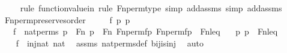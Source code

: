 \begin{isabellebody}
\ \ \ \ \isamarkupfalse%
{\isacharparenleft}{\kern0pt}rule\ function{\isacharunderscore}{\kern0pt}value{\isacharunderscore}{\kern0pt}in{\isacharcomma}{\kern0pt}\ rule\ Fn{\isacharunderscore}{\kern0pt}perm{\isacharprime}{\kern0pt}{\isacharunderscore}{\kern0pt}type{\isacharcomma}{\kern0pt}\ simp\ add{\isacharcolon}{\kern0pt}assms{\isacharcomma}{\kern0pt}\ simp\ add{\isacharcolon}{\kern0pt}assms{\isacharparenright}{\kern0pt}\isanewline
\ \ \ \ \isamarkupfalse%
\isanewline
{}\isamarkupfalse%
%
\endisatagproof
{\isafoldproof}%
%
\isadelimproof
\isanewline
%
\endisadelimproof
\isanewline
{}\isamarkupfalse%
\ Fn{\isacharunderscore}{\kern0pt}perm{\isacharprime}{\kern0pt}{\isacharunderscore}{\kern0pt}preserves{\isacharunderscore}{\kern0pt}order{\isacharprime}{\kern0pt}\ {\isacharcolon}{\kern0pt}\ \isanewline
\ \ \ f\ p\ p{\isacharprime}{\kern0pt}\ \isanewline
\ \ \ {\isachardoublequoteopen}f\ {\isasymin}\ nat{\isacharunderscore}{\kern0pt}perms{\isachardoublequoteclose}\ {\isachardoublequoteopen}p\ {\isasymin}\ Fn{\isachardoublequoteclose}\ {\isachardoublequoteopen}p{\isacharprime}{\kern0pt}\ {\isasymin}\ Fn{\isachardoublequoteclose}\ {\isachardoublequoteopen}{\isacharless}{\kern0pt}Fn{\isacharunderscore}{\kern0pt}perm{\isacharprime}{\kern0pt}{\isacharparenleft}{\kern0pt}f{\isacharparenright}{\kern0pt}{\isacharbackquote}{\kern0pt}p{\isacharcomma}{\kern0pt}\ Fn{\isacharunderscore}{\kern0pt}perm{\isacharprime}{\kern0pt}{\isacharparenleft}{\kern0pt}f{\isacharparenright}{\kern0pt}{\isacharbackquote}{\kern0pt}p{\isacharprime}{\kern0pt}{\isachargreater}{\kern0pt}\ {\isasymin}\ Fn{\isacharunderscore}{\kern0pt}leq{\isachardoublequoteclose}\isanewline
\ \ \ {\isachardoublequoteopen}{\isacharless}{\kern0pt}p{\isacharcomma}{\kern0pt}\ p{\isacharprime}{\kern0pt}{\isachargreater}{\kern0pt}\ {\isasymin}\ Fn{\isacharunderscore}{\kern0pt}leq{\isachardoublequoteclose}\ \isanewline
%
\isadelimproof
%
\endisadelimproof
%
\isatagproof
{}\isamarkupfalse%
\ {\isacharminus}{\kern0pt}\ \isanewline
\ \ \isamarkupfalse%
\ {\isachardoublequoteopen}f\ {\isasymin}\ inj{\isacharparenleft}{\kern0pt}nat{\isacharcomma}{\kern0pt}\ nat{\isacharparenright}{\kern0pt}{\isachardoublequoteclose}\ \isamarkupfalse%
\ assms\ nat{\isacharunderscore}{\kern0pt}perms{\isacharunderscore}{\kern0pt}def\ bij{\isacharunderscore}{\kern0pt}is{\isacharunderscore}{\kern0pt}inj\ \isamarkupfalse%
\ auto\isanewline
\ \ \isamarkupfalse%

\end{isabellebody}
